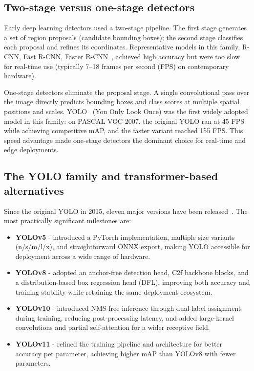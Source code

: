 \documentclass[12pt,a4paper]{report}
\begin{document}
\subsection*{Two-stage versus one-stage detectors}

Early deep learning detectors used a two-stage pipeline.
The first stage generates a set of region proposals (candidate bounding boxes); the second stage classifies each
proposal and refines its coordinates.
Representative models in this family, R-CNN, Fast R-CNN, Faster R-CNN~\cite{ren2015faster}, achieved high accuracy
but were too slow for real-time use (typically 7--18 frames per second (FPS) on contemporary hardware).

One-stage detectors eliminate the proposal stage.
A single convolutional pass over the image directly predicts bounding boxes and class scores at multiple spatial
positions and scales.
YOLO~\cite{Redmon2016YOLO} (You Only Look Once) was the first widely adopted model in this family: on PASCAL VOC 2007,
the original YOLO ran at 45 FPS while achieving competitive mAP, and the faster variant reached 155 FPS.
This speed advantage made one-stage detectors the dominant choice for real-time and edge deployments.

\subsection*{The YOLO family and transformer-based alternatives}

Since the original YOLO in 2015, eleven major versions have been released~\cite{khanam2024yolov11}.
The most practically significant milestones are:

\begin{itemize}
  \item \textbf{YOLOv5} - introduced a PyTorch implementation, multiple size variants (n/s/m/l/x), and straightforward
  ONNX export, making YOLO accessible for deployment across a wide range of hardware.
  \item \textbf{YOLOv8} - adopted an anchor-free detection head, C2f backbone blocks, and a distribution-based box
  regression head (DFL), improving both accuracy and training stability while retaining the same deployment ecosystem.
  \item \textbf{YOLOv10} - introduced NMS-free inference through dual-label assignment during training, reducing
  post-processing latency, and added large-kernel convolutions and partial self-attention for a wider receptive field.
  \item \textbf{YOLOv11} - refined the training pipeline and architecture for better accuracy per parameter, achieving
  higher mAP than YOLOv8 with fewer parameters.
\end{itemize}
\end{document}
